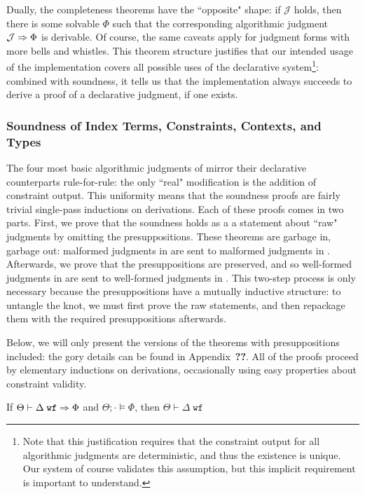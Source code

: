 Dually, the completeness theorems have the ``opposite" shape: if $\mathcal{J}$ holds, then there is some solvable $\Phi$ such that the corresponding algorithmic judgment $\mathcal{J} \Rightarrow \Phi$ is derivable. Of course, the same caveats apply for judgment forms with more bells and whistles. This theorem structure justifies that our intended usage of the implementation covers all possible uses of the declarative system\footnote{Note that this justification requires that the constraint output for all algorithmic judgments are deterministic, and thus the existence is unique. Our system of course validates this assumption, but this implicit requirement is important to understand.}: combined with soundness, it tells us that the implementation always succeeds to derive a proof of a declarative judgment, if one exists.

\subsubsection{Soundness of Index Terms, Constraints, Contexts, and Types}
The four most basic algorithmic judgments of \bilambdaamor mirror their declarative counterparts rule-for-rule: the only ``real" modification is the addition of constraint output. This uniformity means that the soundness proofs are fairly trivial single-pass inductions on derivations. Each of these proofs comes in two parts. First, we prove that the soundness holds as a a statement about ``raw" judgments by omitting the presuppositions. These theorems are garbage in, garbage out: malformed judgments in \bilambdaamor are sent to malformed judgments in \dlambdaamor. Afterwards, we prove that the presuppositions are preserved, and so well-formed judgments in \bilambdaamor are sent to well-formed judgments in \dlambdaamor. This two-step process is only necessary because the presuppositions have a mutually inductive structure: to untangle the knot, we must first prove the raw statements, and then repackage them with the required presuppositions afterwards.


Below, we will only present the versions of the theorems with presuppositions included: the gory details can be found in Appendix~\textbf{??}. All of the proofs proceed by elementary inductions on derivations, occasionally using easy properties about constraint validity.

\begin{theorem}
If $\Theta \vdash \Delta \; \texttt{wf} \Rightarrow \Phi$ and $\Theta ; \cdot \vDash \Phi$, then $\Theta \vdash \Delta \; \texttt{wf}$
\label{thm:idx-ctx-wf-sound}
\end{theorem}

